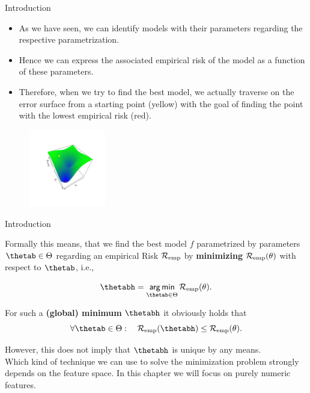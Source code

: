 \documentclass[11pt,compress,t,notes=noshow, xcolor=table]{beamer}
\begin{document}
\begin{vbframe}{Introduction}
\begin{itemize}
\item As we have seen, we can identify models with their parameters regarding the respective parametrization. 
\item Hence we can express the associated empirical risk of the model as a function of these parameters.
\item Therefore, when we try to find the best model, we actually traverse on the error surface from a starting point (yellow) with the goal of finding the point with the lowest empirical risk (red).
\end{itemize}
\begin{center}
\begin{figure}[!b]
\includegraphics[trim=2.4cm 2.4cm 2.4cm 2.4cm, width=0.3\textwidth]{figure/err_surf}
\end{figure}
\end{center}

\end{vbframe}
\begin{vbframe}{Introduction}

Formally this means, that we find the best model $f$ parametrized by parameters $\thetab \in \Theta$ regarding an empirical Risk $\mathcal{R}_{\text{emp}}$ by \textbf{minimizing} $\mathcal{R}_{\text{emp}}(\theta)$ with respect to $\thetab$, i.e., 

\[
\thetabh  = \argmin_{\thetab \in \Theta} \risket .
\]

For such a \textbf{(global) minimum} $\thetabh$ it obviously holds that 
\[
\forall \thetab \in \Theta :\quad \riske(\thetabh) \leq \risket .
\]

However, this does not imply that $\thetabh$ is unique by any means. \\
\lz
Which kind of technique we can use to solve the minimization problem strongly depends on the feature space. In this chapter we will focus on purely numeric features.

\end{vbframe}
\end{document}
